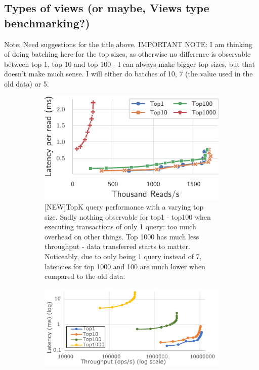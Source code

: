 \documentclass[sigplan,10pt]{acmart}
\begin{document}
\subsection{Types of views (or maybe, Views type benchmarking?)}

Note: Need suggestions for the title above.
IMPORTANT NOTE: I am thinking of doing batching here for the top sizes, as otherwise no difference is observable between top 1, top 10 and top 100 - I can always make bigger top sizes, but that doesn't make much sense.
I will either do batches of 10, 7 (the value used in the old data) or 5.

\begin{figure}[h]
	\centering
	\begin{subfigure}{.47\linewidth}
		\includegraphics[width=1\linewidth]{singleQuery/bench_top_size_0_upd}
		\caption{[NEW]TopK query performance with a varying top size. Sadly nothing observable for top1 - top100 when executing transactions of only 1 query: too much overhead on other things. Top 1000 has much less throughput - data transferred starts to matter. Noticeably, due to only being 1 query instead of 7, latencies for top 1000 and 100 are much lower when compared to the old data.}
		\label{fig:(new)bench_top_size_0upd}
	\end{subfigure}%
	\hspace*{3em}
	\begin{subfigure}{.47\linewidth}
		\includegraphics[width=1\linewidth]{TopKTopSize0upd_cut}

\end{subfigure}
\end{figure}
\end{document}
